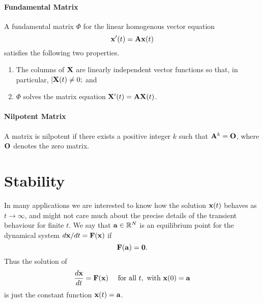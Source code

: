 \paragraph{Fundamental Matrix}
A fundamental matrix \(\Phi\) for the linear homogenous vector equation
\[\mathbf{x}'(t) = \mathbf{A}\mathbf{x}(t)\]
satisfies the following two properties.
\begin{enumerate}
    \item The columns of \(\mathbf{X}\) are linearly independent vector functions so that, in particular, \(|\mathbf{X}(t) \neq 0;\) and
    \item \(\Phi\) solves the matrix equation \(\mathbf{X}'(t) = \mathbf{A}\mathbf{X}(t)\).
\end{enumerate}


\paragraph{Nilpotent Matrix}
A matrix is nilpotent if there exists a positive integer \(k\) such that \(\mathbf{A}^k = \mathbf{O}\), where \(\mathbf{O}\) denotes the zero matrix.


\section{Stability}
In many applications we are interested to know how the solution \(\mathbf{x}(t)\) behaves as \(t \to \infty\), and might not care much about the precise details of the transient behaviour for finite \(t\).
We say that \(\mathbf{a} \in \mathbb{R}^N\) is an equilibrium point for the dynamical system \(d \mathbf{x} / dt = \mathbf{F}(\mathbf{x})\) if
\[\mathbf{F}(\mathbf{a}) = \mathbf{0}.\]
Thus the solution of
\[\frac{d\mathbf{x}}{dt} = \mathbf{F}(\mathbf{x}) \quad  \text{ for all } t, \text{ with } \mathbf{x}(0) = \mathbf{a}\]
is just the constant function \(\mathbf{x}(t) = \mathbf{a}\).

